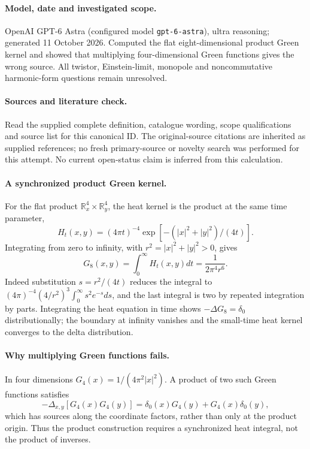 \documentclass[11pt]{article}
\begin{document}
\paragraph{Model, date and investigated scope.}
OpenAI GPT-6 Astra (configured model \texttt{gpt-6-astra}), ultra reasoning; generated 11 October 2026. Computed the flat eight-dimensional product Green kernel and showed that multiplying four-dimensional Green functions gives the wrong source. All twistor, Einstein-limit, monopole and noncommutative harmonic-form questions remain unresolved.

\paragraph{Sources and literature check.}
Read the supplied complete definition, catalogue wording, scope qualifications and source list for this canonical ID. The original-source citations are inherited as supplied references; no fresh primary-source or novelty search was performed for this attempt. No current open-status claim is inferred from this calculation.

\paragraph{A synchronized product Green kernel.}For the flat product \(\mathbb R^4_x\times\mathbb R^4_y\), the heat kernel is the product at the same time parameter,
\[H_t(x,y)=(4\pi t)^{-4}\exp[-(|x|^2+|y|^2)/(4t)].\]
Integrating from zero to infinity, with \(r^2=|x|^2+|y|^2>0\), gives
\[G_8(x,y)=\int_0^\infty H_t(x,y)dt=\frac1{2\pi^4r^6}.
\]
Indeed substitution \(s=r^2/(4t)\) reduces the integral to \((4\pi)^{-4}(4/r^2)^3\int_0^\infty s^2e^{-s}ds\), and the last integral is two by repeated integration by parts. Integrating the heat equation in time shows \(-\Delta G_8=\delta_0\) distributionally; the boundary at infinity vanishes and the small-time heat kernel converges to the delta distribution.
\paragraph{Why multiplying Green functions fails.}In four dimensions \(G_4(x)=1/(4\pi^2|x|^2)\). A product of two such Green functions satisfies
\[-\Delta_{x,y}[G_4(x)G_4(y)]=\delta_0(x)G_4(y)+G_4(x)\delta_0(y),\]
which has sources along the coordinate factors, rather than only at the product origin. Thus the product construction requires a synchronized heat integral, not the product of inverses.
\end{document}
